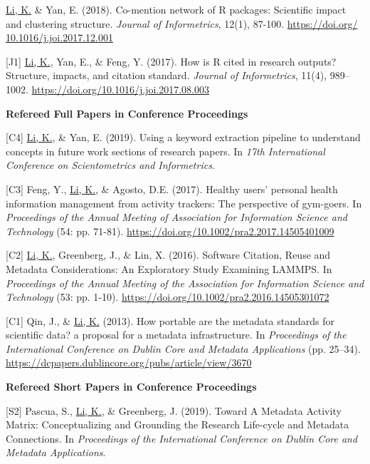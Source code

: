 \documentclass[margin, 10pt]{res} %
\begin{document}
\begin{resume}
[J2] \underline{Li, K.} \& Yan, E. (2018). Co-mention network of R packages: Scientific impact and clustering structure. \textit{Journal of Informetrics}, 12(1), 87-100. \href{https://doi.org/10.1016/j.joi.2017.12.001}{https://doi.org/ 10.1016/j.joi.2017.12.001}

[J1] \underline{Li, K.}, Yan, E., \& Feng, Y. (2017). How is R cited in research outputs? Structure, impacts, and citation standard. \textit{Journal of Informetrics}, 11(4), 989–1002. \href{https://doi.org/10.1016/j.joi.2017.08.003}{https://doi.org/10.1016/j.joi.2017.08.003}

\textbf{Refereed Full Papers in Conference Proceedings}

[C4] \underline{Li, K.}, \& Yan, E. (2019). Using a keyword extraction pipeline to understand concepts in future work sections of research papers. In \textit{17th International Conference on Scientometrics and Informetrics}.

[C3] Feng, Y., \underline{Li, K.}, \& Agosto, D.E. (2017). Healthy users’ personal health information management from activity trackers: The perspective of gym-goers. In \textit{Proceedings of the Annual Meeting of Association for Information Science and Technology} (54: pp. 71-81). \href{https://doi.org/10.1002/pra2.2017.14505401009}{https://doi.org/10.1002/pra2.2017.14505401009}

[C2] \underline{Li, K.}, Greenberg, J., \& Lin, X. (2016). Software Citation, Reuse and Metadata Considerations: An Exploratory Study Examining LAMMPS. In \textit{Proceedings of the Annual Meeting of the Association for Information Science and Technology} (53: pp. 1-10). \href{https://doi.org/10.1002/pra2.2016.14505301072}{https://doi.org/10.1002/pra2.2016.14505301072}

[C1] Qin, J., \& \underline{Li, K.} (2013). How portable are the metadata standards for scientific data? a proposal for a metadata infrastructure. In \textit{Proceedings of the International Conference on Dublin Core and Metadata Applications} (pp. 25–34). \href{https://dcpapers.dublincore.org/pubs/article/view/3670}{https://dcpapers.dublincore.org/pubs/article/view/3670}

\textbf{Refereed Short Papers in Conference Proceedings}

[S2] Pascua, S., \underline{Li, K.}, \& Greenberg, J. (2019). Toward A Metadata Activity Matrix: Conceptualizing and Grounding the Research Life-cycle and Metadata Connections. In \textit{Proceedings of the International Conference on Dublin Core and Metadata Applications}.


\end{resume}
\end{document}

